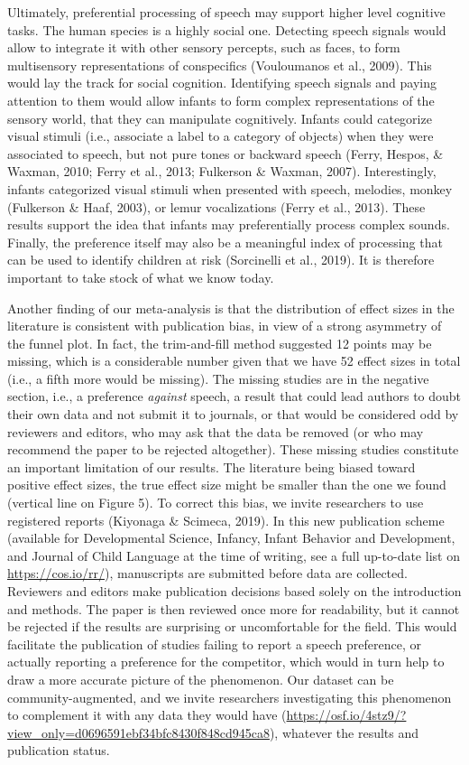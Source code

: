 \documentclass[man]{apa6}
\begin{document}
Ultimately, preferential processing of speech may support higher level cognitive tasks. The human species is a highly social one. Detecting speech signals would allow to integrate it with other sensory percepts, such as faces, to form multisensory representations of conspecifics (Vouloumanos et al., 2009). This would lay the track for social cognition. Identifying speech signals and paying attention to them would allow infants to form complex representations of the sensory world, that they can manipulate cognitively. Infants could categorize visual stimuli (i.e., associate a label to a category of objects) when they were associated to speech, but not pure tones or backward speech (Ferry, Hespos, \& Waxman, 2010; Ferry et al., 2013; Fulkerson \& Waxman, 2007). Interestingly, infants categorized visual stimuli when presented with speech, melodies, monkey (Fulkerson \& Haaf, 2003), or lemur vocalizations (Ferry et al., 2013). These results support the idea that infants may preferentially process complex sounds. Finally, the preference itself may also be a meaningful index of processing that can be used to identify children at risk (Sorcinelli et al., 2019). It is therefore important to take stock of what we know today.

Another finding of our meta-analysis is that the distribution of effect sizes in the literature is consistent with publication bias, in view of a strong asymmetry of the funnel plot. In fact, the trim-and-fill method suggested 12 points may be missing, which is a considerable number given that we have 52 effect sizes in total (i.e., a fifth more would be missing). The missing studies are in the negative section, i.e., a preference \emph{against} speech, a result that could lead authors to doubt their own data and not submit it to journals, or that would be considered odd by reviewers and editors, who may ask that the data be removed (or who may recommend the paper to be rejected altogether). These missing studies constitute an important limitation of our results. The literature being biased toward positive effect sizes, the true effect size might be smaller than the one we found (vertical line on Figure 5). To correct this bias, we invite researchers to use registered reports (Kiyonaga \& Scimeca, 2019). In this new publication scheme (available for Developmental Science, Infancy, Infant Behavior and Development, and Journal of Child Language at the time of writing, see a full up-to-date list on \url{https://cos.io/rr/}), manuscripts are submitted before data are collected. Reviewers and editors make publication decisions based solely on the introduction and methods. The paper is then reviewed once more for readability, but it cannot be rejected if the results are surprising or uncomfortable for the field. This would facilitate the publication of studies failing to report a speech preference, or actually reporting a preference for the competitor, which would in turn help to draw a more accurate picture of the phenomenon. Our dataset can be community-augmented, and we invite researchers investigating this phenomenon to complement it with any data they would have (\url{https://osf.io/4stz9/?view_only=d0696591ebf34bfc8430f848cd945ca8}), whatever the results and publication status.
\end{document}
